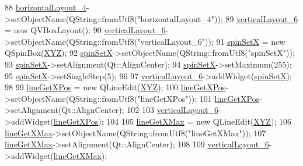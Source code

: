 \begin{DoxyCode}
88         \hyperlink{class_ui___e3_p_j_r_aeb3eff1a8b0673c92f1ed957263d272b}{horizontalLayout\_4}->setObjectName(QString::fromUtf8(\textcolor{stringliteral}{"horizontalLayout\_4"}));
89         \hyperlink{class_ui___e3_p_j_r_a123f4222372065593b6a3433ac1dde9d}{verticalLayout\_6} = \textcolor{keyword}{new} QVBoxLayout();
90         \hyperlink{class_ui___e3_p_j_r_a123f4222372065593b6a3433ac1dde9d}{verticalLayout\_6}->setObjectName(QString::fromUtf8(\textcolor{stringliteral}{"verticalLayout\_6"}));
91         \hyperlink{class_ui___e3_p_j_r_ab782845855d3c29e2d229ff09b717771}{spinSetX} = \textcolor{keyword}{new} QSpinBox(\hyperlink{class_ui___e3_p_j_r_a098a80b873d9e0a09fd834f09e5028b4}{XYZ});
92         \hyperlink{class_ui___e3_p_j_r_ab782845855d3c29e2d229ff09b717771}{spinSetX}->setObjectName(QString::fromUtf8(\textcolor{stringliteral}{"spinSetX"}));
93         \hyperlink{class_ui___e3_p_j_r_ab782845855d3c29e2d229ff09b717771}{spinSetX}->setAlignment(Qt::AlignCenter);
94         \hyperlink{class_ui___e3_p_j_r_ab782845855d3c29e2d229ff09b717771}{spinSetX}->setMaximum(255);
95         \hyperlink{class_ui___e3_p_j_r_ab782845855d3c29e2d229ff09b717771}{spinSetX}->setSingleStep(5);
96 
97         \hyperlink{class_ui___e3_p_j_r_a123f4222372065593b6a3433ac1dde9d}{verticalLayout\_6}->addWidget(\hyperlink{class_ui___e3_p_j_r_ab782845855d3c29e2d229ff09b717771}{spinSetX});
98 
99         \hyperlink{class_ui___e3_p_j_r_a2aa996a4bf178178f8c776bd139e1e98}{lineGetXPos} = \textcolor{keyword}{new} QLineEdit(\hyperlink{class_ui___e3_p_j_r_a098a80b873d9e0a09fd834f09e5028b4}{XYZ});
100         \hyperlink{class_ui___e3_p_j_r_a2aa996a4bf178178f8c776bd139e1e98}{lineGetXPos}->setObjectName(QString::fromUtf8(\textcolor{stringliteral}{"lineGetXPos"}));
101         \hyperlink{class_ui___e3_p_j_r_a2aa996a4bf178178f8c776bd139e1e98}{lineGetXPos}->setAlignment(Qt::AlignCenter);
102 
103         \hyperlink{class_ui___e3_p_j_r_a123f4222372065593b6a3433ac1dde9d}{verticalLayout\_6}->addWidget(\hyperlink{class_ui___e3_p_j_r_a2aa996a4bf178178f8c776bd139e1e98}{lineGetXPos});
104 
105         \hyperlink{class_ui___e3_p_j_r_aa70a702ff832048eb7b3a06560b1cccd}{lineGetXMax} = \textcolor{keyword}{new} QLineEdit(\hyperlink{class_ui___e3_p_j_r_a098a80b873d9e0a09fd834f09e5028b4}{XYZ});
106         \hyperlink{class_ui___e3_p_j_r_aa70a702ff832048eb7b3a06560b1cccd}{lineGetXMax}->setObjectName(QString::fromUtf8(\textcolor{stringliteral}{"lineGetXMax"}));
107         \hyperlink{class_ui___e3_p_j_r_aa70a702ff832048eb7b3a06560b1cccd}{lineGetXMax}->setAlignment(Qt::AlignCenter);
108 
109         \hyperlink{class_ui___e3_p_j_r_a123f4222372065593b6a3433ac1dde9d}{verticalLayout\_6}->addWidget(\hyperlink{class_ui___e3_p_j_r_aa70a702ff832048eb7b3a06560b1cccd}{lineGetXMax});

\end{DoxyCode}
